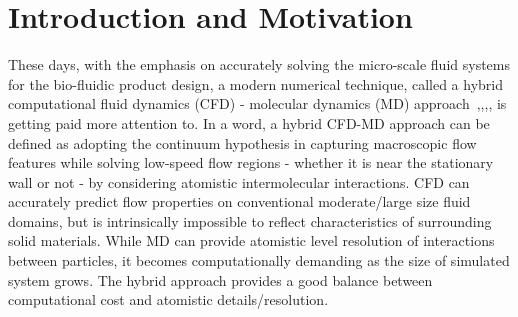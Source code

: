 \documentclass[conference,final]{IEEEtran}
\newcommand{\skonote}[1]{ {\textcolor{blue} { ***Jeff: #1 }}}
\newcommand{\skonote}[1]{}
\newcommand{\up}{\vspace*{-1em}}
\begin{document}
\begin{abstract}
\end{abstract}
\up\up


\section{Introduction and Motivation}

These days, with the emphasis on accurately solving the micro-scale fluid systems for the bio-fluidic product design, a modern numerical technique, called a hybrid computational fluid dynamics (CFD) - molecular dynamics (MD) approach~\cite{Thompson},\cite{Nie},\cite{Yen},\cite{Steijl}, is getting paid more attention to. In a word, a hybrid CFD-MD approach can be defined as adopting the continuum hypothesis in capturing macroscopic flow features while solving low-speed flow regions - whether it is near the stationary wall or not - by considering atomistic intermolecular interactions. CFD can accurately predict flow properties on conventional moderate/large size fluid domains, but is intrinsically impossible to reflect characteristics of surrounding solid materials. While MD can provide atomistic level resolution of interactions between particles, it becomes computationally demanding as the size of simulated system grows. The hybrid approach provides a good balance between computational cost and atomistic details/resolution.
\end{document}
